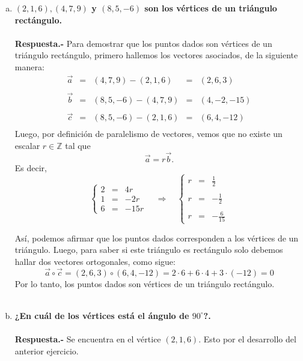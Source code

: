 \begin{enumerate}
\begin{enumerate}[a)]
	\item \textbf{\boldmath $(2,1,6), (4,7,9)$ y $(8,5,-6)$ son los vértices de un triángulo rectángulo.\\\\
	    Respuesta.-}\; Para demostrar que los puntos dados son vértices de un triángulo rectángulo, primero hallemos los vectores asociados, de la siguiente manera:
	    $$\begin{array}{rcccl}
		\vec{a} &=& (4,7,9)-(2,1,6) &=& (2,6,3)\\\\
		\vec{b} &=& (8,5,-6)-(4,7,9) &=& (4,-2,-15)\\\\
		\vec{c} &=& (8,5,-6)-(2,1,6) &=& (6,4,-12)\\
	    \end{array}$$
	    Luego, por definición de paralelismo de vectores, vemos que no existe un escalar $r\in \mathbb{Z}$ tal que 
	    $$\vec{a}=r\vec{b}.$$
	    Es decir,
	    $$\left\{\begin{array}{crr}
		    2&=&4r\\
		    1&=&-2r\\
		    6&=&-15r
		\end{array}\right. \quad \Rightarrow \quad
		\left\{\begin{array}{rcr}
		    r&=&\frac{1}{2}\\\\
		    r&=&-\frac{1}{2}\\\\
		    r&=&-\frac{6}{15}
		\end{array}\right.$$

	Así, podemos afirmar que los puntos dados corresponden a los vértices de un triángulo. Luego, para saber si este triángulo es rectángulo solo debemos hallar dos vectores ortogonales, como sigue:
	$$\vec{a}\circ \vec{c} =  (2,6,3)\circ (6,4,-12) = 2\cdot 6 + 6\cdot 4+3\cdot (-12) = 0$$
	Por lo tanto, los puntos dados son vértices de un triángulo rectángulo.\\\\

	\item \textbf{\boldmath ¿En cuál de los vértices está el ángulo de $90^\circ$?.\\\\
	    Respuesta.-}\; Se encuentra en el vértice $(2,1,6)$. Esto por el desarrollo del anterior ejercicio.\\\\


\end{enumerate}
\end{enumerate}
